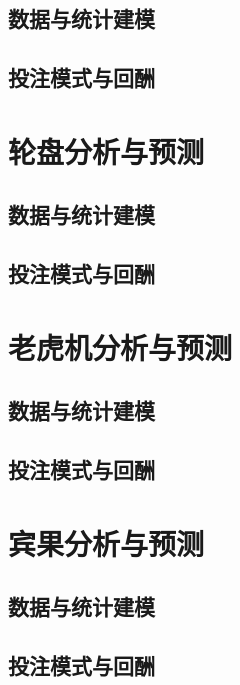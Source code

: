 \documentclass[]{book}
\theoremstyle{definition}
\theoremstyle{definition}
\theoremstyle{definition}
\theoremstyle{remark}
\begin{document}
\subsection{数据与统计建模}

\subsection{投注模式与回酬}

\section{轮盘分析与预测}

\hypertarget{-1}{%
\subsection{数据与统计建模}\label{-1}}

\hypertarget{-1}{%
\subsection{投注模式与回酬}\label{-1}}

\section{老虎机分析与预测}

\hypertarget{-2}{%
\subsection{数据与统计建模}\label{-2}}

\hypertarget{-2}{%
\subsection{投注模式与回酬}\label{-2}}

\section{宾果分析与预测}

\hypertarget{-3}{%
\subsection{数据与统计建模}\label{-3}}

\hypertarget{-3}{%
\subsection{投注模式与回酬}\label{-3}}
\end{document}
